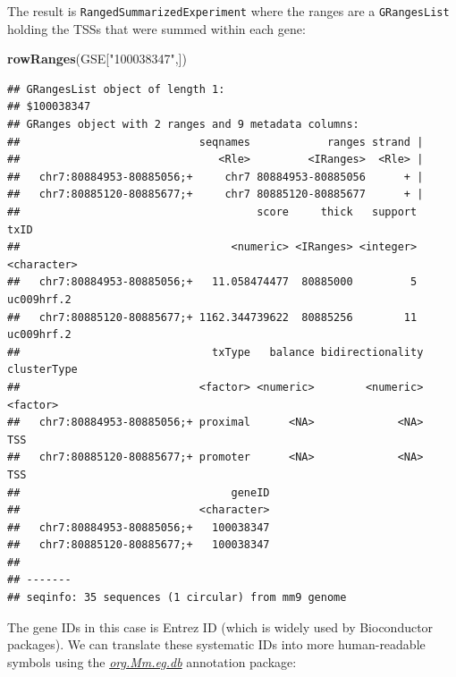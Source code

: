 \documentclass[9pt,a4paper,]{extarticle}
\newenvironment{Shaded}{\begin{snugshade}}{\end{snugshade}}
\newcommand{\KeywordTok}[1]{\textcolor[rgb]{0.13,0.29,0.53}{\textbf{{#1}}}}
\newcommand{\DataTypeTok}[1]{\textcolor[rgb]{0.13,0.29,0.53}{{#1}}}
\newcommand{\StringTok}[1]{\textcolor[rgb]{0.31,0.60,0.02}{{#1}}}
\newcommand{\CommentTok}[1]{\textcolor[rgb]{0.56,0.35,0.01}{\textit{{#1}}}}
\newcommand{\NormalTok}[1]{{#1}}
\begin{document}
The result is \texttt{RangedSummarizedExperiment} where the ranges are a \texttt{GRangesList} holding the TSSs that were summed within each gene:

\begin{Shaded}
\begin{Highlighting}[]
\KeywordTok{rowRanges}\NormalTok{(GSE[}\StringTok{"100038347"}\NormalTok{,])}
\end{Highlighting}
\end{Shaded}

\begin{verbatim}
## GRangesList object of length 1:
## $100038347 
## GRanges object with 2 ranges and 9 metadata columns:
##                            seqnames            ranges strand |
##                               <Rle>         <IRanges>  <Rle> |
##   chr7:80884953-80885056;+     chr7 80884953-80885056      + |
##   chr7:80885120-80885677;+     chr7 80885120-80885677      + |
##                                     score     thick   support        txID
##                                 <numeric> <IRanges> <integer> <character>
##   chr7:80884953-80885056;+   11.058474477  80885000         5  uc009hrf.2
##   chr7:80885120-80885677;+ 1162.344739622  80885256        11  uc009hrf.2
##                              txType   balance bidirectionality clusterType
##                            <factor> <numeric>        <numeric>    <factor>
##   chr7:80884953-80885056;+ proximal      <NA>             <NA>         TSS
##   chr7:80885120-80885677;+ promoter      <NA>             <NA>         TSS
##                                 geneID
##                            <character>
##   chr7:80884953-80885056;+   100038347
##   chr7:80885120-80885677;+   100038347
## 
## -------
## seqinfo: 35 sequences (1 circular) from mm9 genome
\end{verbatim}

The gene IDs in this case is Entrez ID (which is widely used by Bioconductor packages). We can translate these systematic IDs into more human-readable symbols using the \emph{\href{https://bioconductor.org/packages/3.8/org.Mm.eg.db}{org.Mm.eg.db}} annotation package:

\begin{Shaded}
\end{Shaded}
\end{document}

